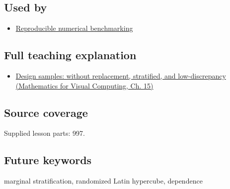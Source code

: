 \subsection{Used by}\label{appendix-1c5e85693a06-used-by}

\hypertarget{appendix-1c5e85693a06-used-by}{}

\begin{itemize}
\tightlist
\item
  \hyperref[appendix-b9db93e28371]{Reproducible numerical benchmarking}
\end{itemize}

\subsection{Full teaching explanation}\label{appendix-1c5e85693a06-full-teaching-explanation}

\hypertarget{appendix-1c5e85693a06-full-teaching-explanation}{}

\begin{itemize}
\tightlist
\item
  \href{../02-Mathematics-for-Visual-Computing/main.pdf\#nameddest=02-foundations-ii-ch031-design-samples-without-replacement-stratified-and-low-discrepancy}{Design samples: without replacement, stratified, and low-discrepancy (Mathematics for Visual Computing, Ch. 15)}
\end{itemize}

\subsection{Source coverage}\label{appendix-1c5e85693a06-source-coverage}

\hypertarget{appendix-1c5e85693a06-source-coverage}{}

Supplied lesson parts: 997.

\subsection{Future keywords}\label{appendix-1c5e85693a06-future-keywords}

\hypertarget{appendix-1c5e85693a06-future-keywords}{}

marginal stratification, randomized Latin hypercube, dependence
